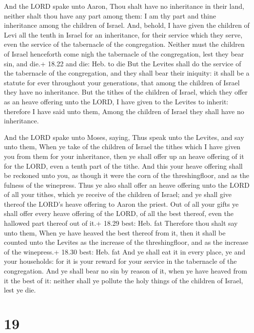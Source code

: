  And the LORD spake unto Aaron, Thou shalt have no
inheritance in their land, neither shalt thou have any part among them:
I am thy part and thine inheritance among the children of Israel.
 And, behold, I have given the children of Levi all the
tenth in Israel for an inheritance, for their service which they serve,
even the service of the tabernacle of the congregation. 
Neither must the children of Israel henceforth come nigh the tabernacle
of the congregation, lest they bear sin, and die.+ 18.22 and die: Heb.
to die  But the Levites shall do the service of the
tabernacle of the congregation, and they shall bear their iniquity: it
shall be a statute for ever throughout your generations, that among the
children of Israel they have no inheritance.  But the
tithes of the children of Israel, which they offer as an heave offering
unto the LORD, I have given to the Levites to inherit: therefore I have
said unto them, Among the children of Israel they shall have no
inheritance.

 And the LORD spake unto Moses, saying, 
Thus speak unto the Levites, and say unto them, When ye take of the
children of Israel the tithes which I have given you from them for your
inheritance, then ye shall offer up an heave offering of it for the
LORD, even a tenth part of the tithe.  And this your heave
offering shall be reckoned unto you, as though it were the corn of the
threshingfloor, and as the fulness of the winepress.  Thus
ye also shall offer an heave offering unto the LORD of all your tithes,
which ye receive of the children of Israel; and ye shall give thereof
the LORD's heave offering to Aaron the priest.  Out of all
your gifts ye shall offer every heave offering of the LORD, of all the
best thereof, even the hallowed part thereof out of it.+ 18.29 best:
Heb. fat  Therefore thou shalt say unto them, When ye have
heaved the best thereof from it, then it shall be counted unto the
Levites as the increase of the threshingfloor, and as the increase of
the winepress.+ 18.30 best: Heb. fat  And ye shall eat it
in every place, ye and your households: for it is your reward for your
service in the tabernacle of the congregation.  And ye
shall bear no sin by reason of it, when ye have heaved from it the best
of it: neither shall ye pollute the holy things of the children of
Israel, lest ye die.

\hypertarget{section-18}{%
\section{19}\label{section-18}}

